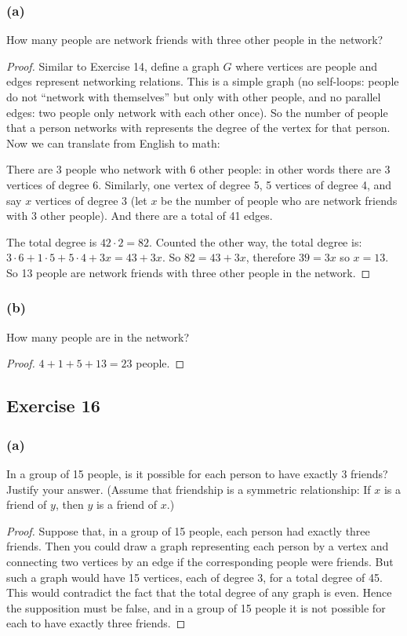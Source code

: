 \documentclass[14pt]{extarticle}
\begin{document}
\subsubsection{(a)}
How many people are network friends with three other people in the network?

\begin{proof}
Similar to Exercise 14, define a graph $G$ where vertices are people and edges represent networking relations. This is a simple graph (no self-loops: people do not ``network with themselves'' but only with other people, and no parallel edges: two people only network with each other once). So the number of people that a person networks with represents the degree of the vertex for that person. Now we can translate from English to math:

There are 3 people who network with 6 other people: in other words there are 3 vertices of degree 6. Similarly, one vertex of degree 5, 5 vertices of degree 4, and say $x$ vertices of degree 3 (let $x$ be the number of people who are network friends with 3 other people). And there are a total of 41 edges.

The total degree is $42 \cdot 2 = 82$. Counted the other way, the total degree is: $3 \cdot 6 + 1 \cdot 5 + 5 \cdot 4 + 3x = 43+3x$. So $82 = 43+3x$, therefore $39 = 3x$ so $x = 13$. So 13 people are network friends with three other people in the network.
\end{proof}

\subsubsection{(b)}
How many people are in the network?

\begin{proof}
$4 + 1 + 5 + 13 = 23$ people.
\end{proof}

\subsection{Exercise 16}
\subsubsection{(a)}
In a group of 15 people, is it possible for each person to have exactly 3 friends? Justify your answer. (Assume that friendship is a symmetric relationship: If $x$ is a friend of $y$, then $y$ is a friend of $x$.)

\begin{proof}
Suppose that, in a group of 15 people, each person had exactly three friends. Then you could draw a graph representing each person by a vertex and connecting two vertices by an edge if the corresponding people were friends. But such a graph would have 15 vertices, each of degree 3, for a total degree of 45. This would contradict the fact that the total degree of any graph is even. Hence the supposition must be false, and in a group of 15 people it is not possible for each to have exactly three friends.
\end{proof}
\end{document}
